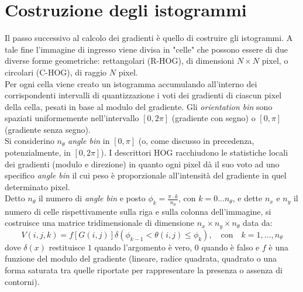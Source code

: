 \section{Costruzione degli istogrammi}
Il passo successivo al calcolo dei gradienti è quello di costruire gli istogrammi. A tale fine l'immagine di ingresso viene divisa in "celle" che possono essere di due diverse forme geometriche: rettangolari (R-HOG), di dimensioni $N\times N $ pixel, o circolari (C-HOG), di raggio $N$ pixel.\\
Per ogni cella viene creato un istogramma accumulando all'interno dei corrispondenti intervalli di quantizzazione i voti dei gradienti di ciascun pixel della cella, pesati in base al modulo del gradiente. 
Gli \emph{orientation bin} sono spaziati uniformemente nell'intervallo $[0, 2\pi]$ (gradiente con segno) o $[0, \pi]$ (gradiente senza segno).\\ 
Si considerino $n_{\theta}$ \emph{angle bin} in $[0,\pi]$ (o, come discusso in precedenza, potenzialmente, in $[0,2\pi]$).
I descrittori HOG racchiudono le statistiche locali dei gradienti (modulo e direzione) in quanto ogni pixel dà il suo voto ad uno specifico \emph{angle bin} il cui peso è proporzionale all'intensità del gradiente in quel determinato pixel. 
\\
Detto $ n_{\theta}$ il numero di \emph{angle bin} e posto ${\phi_{k}}={\frac{\pi\cdot k}{n_{\theta}}}$, con $k=0...n_{\theta}$, e dette $n_{x}$ e $n_{y}$ il numero di celle rispettivamente sulla riga e sulla colonna dell'immagine, si costruisce una matrice tridimensionale di dimensione $n_{x}\times n_{y} \times n_{\theta}$ data da:
\begin{equation}
\label{eq:euquazione_matrice_voti}
V(i,j,k)=f\left [G(i,j)\right ]\delta(\phi_{k-1} <\theta(i,j) \leq\phi_{k}), \quad \text{con} \quad k=1,\ldots,n_{\theta}
\end{equation}
dove $ \delta(x)$ restituisce $1$ quando l'argomento è vero, $0$ quando è falso e $f$ è una funzione del modulo del gradiente (lineare, radice quadrata, quadrato o una forma saturata tra quelle riportate per rappresentare la presenza o assenza di contorni).

